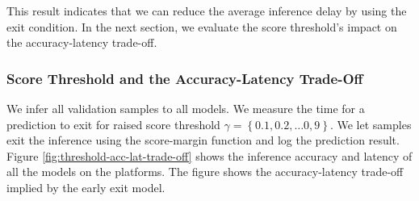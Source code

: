 This result indicates that we can reduce the average inference delay by using the exit condition. In the next section, we evaluate the score threshold's impact on the accuracy-latency trade-off.

\subsubsection{Score Threshold and the Accuracy-Latency Trade-Off}

We infer all validation samples to all models. We measure the time for a prediction to exit for raised score threshold $ \gamma = \left\{0.1, 0.2, \dots 0,9\right\} $. We let samples exit the inference using the score-margin function and log the prediction result. Figure \ref{fig:threshold-acc-lat-trade-off} shows the inference accuracy and latency of all the models on the platforms. The figure shows the accuracy-latency trade-off implied by the early exit model.


